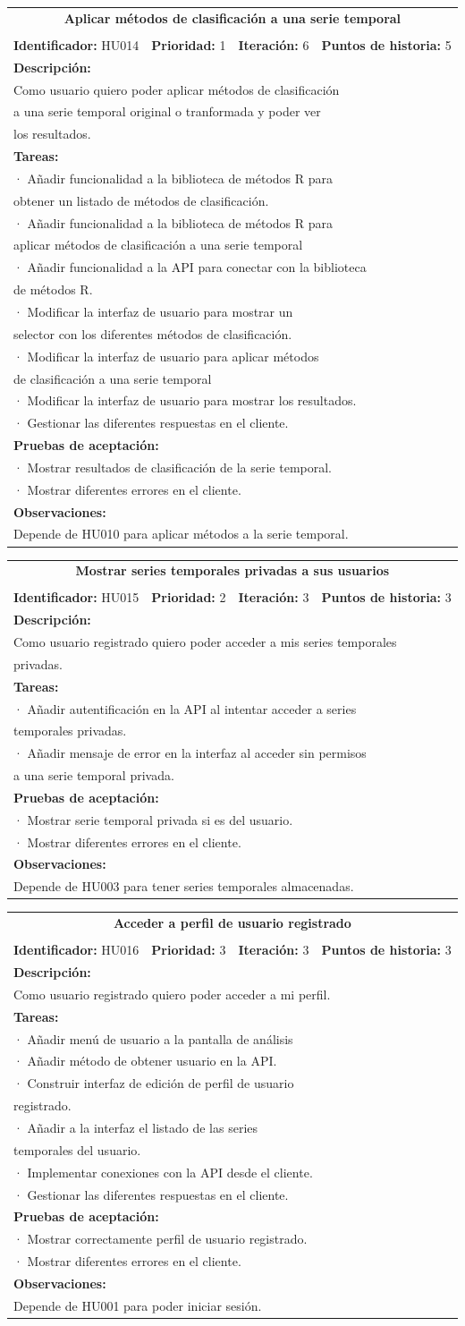 \documentclass[14pt]{extarticle}
\theoremstyle{definition}
\theoremstyle{remark}
\newcommand{\newtableitem}[1] {
	\multicolumn{4}{|l|}{· #1} \\
}
\newcommand{\newtableline}[1] { %
	\multicolumn{4}{|l|}{#1} \\
}
\newcommand{\userstory}[9]{
	\begin{center}
	\resizebox{15cm}{!} {
	\begin{tabular}{|c|c|c|c|}
    	\hline 
		\multicolumn{4}{|c|}{\textbf{#1}} \\
		\multicolumn{4}{|c|}{} \\
		\hline	
		\textbf{Identificador:} #2 & \textbf{Prioridad:} #3 & \textbf{Iteración:} #4 & \textbf{Puntos de historia:} #5 \\ 
		\hline 
		\multicolumn{4}{|l|}{\textbf{Descripción:}} \\
		#6
		\hline 
		\multicolumn{4}{|l|}{\textbf{Tareas:}} \\
		#7
		\hline 
		\multicolumn{4}{|l|}{\textbf{Pruebas de aceptación:}} \\
		#8
		\hline 
		\multicolumn{4}{|l|}{\textbf{Observaciones:}} \\
		#9
		\hline 
	\end{tabular}
	}
	\end{center}
}
\begin{document}
\userstory {Aplicar métodos de clasificación a una serie temporal}
{HU014}{1}{6}{5}
{
	\newtableline {Como usuario quiero poder aplicar métodos de clasificación}
	\newtableline { a una serie temporal original o tranformada y poder ver}
	\newtableline { los resultados.}
}
{ %
	\newtableitem {Añadir funcionalidad a la biblioteca de métodos R para}
		\newtableline { obtener un listado de métodos de clasificación.}
	\newtableitem {Añadir funcionalidad a la biblioteca de métodos R para}
		\newtableline { aplicar métodos de clasificación a una serie temporal}
	\newtableitem {Añadir funcionalidad a la API para conectar con la biblioteca}
		\newtableline { de métodos R.}
	\newtableitem {Modificar la interfaz de usuario para mostrar un}
		\newtableline { selector con los diferentes métodos de clasificación.}
	\newtableitem {Modificar la interfaz de usuario para aplicar métodos}
		\newtableline { de clasificación a una serie temporal}
	\newtableitem {Modificar la interfaz de usuario para mostrar los resultados.}
	\newtableitem {Gestionar las diferentes respuestas en el cliente.}
}
{ %
	\newtableitem {Mostrar resultados de clasificación de la serie temporal.}
	\newtableitem {Mostrar diferentes errores en el cliente.}
}
{ %
	\newtableline {Depende de HU010 para aplicar métodos a la serie temporal.} 
}

\userstory {Mostrar series temporales privadas a sus usuarios}
{HU015}{2}{3}{3}
{
	\newtableline {Como usuario registrado quiero poder acceder a mis series temporales}
	\newtableline { privadas.}
}
{ %
	\newtableitem {Añadir autentificación en la API al intentar acceder a series}
		\newtableline { temporales privadas.}
	\newtableitem {Añadir mensaje de error en la interfaz al acceder sin permisos}
		\newtableline { a una serie temporal privada.}
}
{ %
	\newtableitem {Mostrar serie temporal privada si es del usuario.}
	\newtableitem {Mostrar diferentes errores en el cliente.}
}
{ %
	\newtableline {Depende de HU003 para tener series temporales almacenadas.}
}

\userstory {Acceder a perfil de usuario registrado}
{HU016}{3}{3}{3}
{
	\newtableline {Como usuario registrado quiero poder acceder a mi perfil.}
}
{ %
	\newtableitem {Añadir menú de usuario a la pantalla de análisis}
	\newtableitem {Añadir método de obtener usuario en la API.}
	\newtableitem {Construir interfaz de edición de perfil de usuario}
		\newtableline { registrado.}
	\newtableitem {Añadir a la interfaz el listado de las series}
		\newtableline { temporales del usuario.}
	\newtableitem {Implementar conexiones con la API desde el cliente.}
	\newtableitem {Gestionar las diferentes respuestas en el cliente.}
}
{ %
	\newtableitem {Mostrar correctamente perfil de usuario registrado.}
	\newtableitem {Mostrar diferentes errores en el cliente.}
}
{ %
	\newtableline {Depende de HU001 para poder iniciar sesión.} 
}
\end{document}
